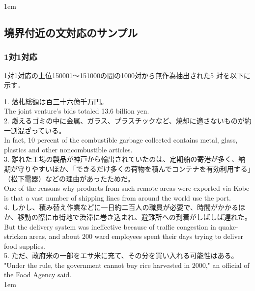 \normalsize
\parindent 1em

\subsection*{境界付近の文対応のサンプル}

\subsubsection*{1対1対応}

1対1対応の上位150001〜151000の間の1000対から無作為抽出された5
対を以下に示す．


\vspace{1em}
\parindent 0cm
\footnotesize

1. 落札総額は百三十六億千万円。\\
The joint venture's bids totaled 13.6 billion yen. \\

2. 燃えるゴミの中に金属、ガラス、プラスチックなど、焼却に適さないものが約一割混ざっている。\\
In fact, 10 percent of the combustible garbage collected contains metal, glass, plastics and other noncombustible articles. \\

3. 離れた工場の製品が神戸から輸出されていたのは、定期船の寄港が多く、納期が守りやすいほか、「できるだけ多くの荷物を積んでコンテナを有効利用する」（松下電器）などの理由があったためだ。\\
One of the reasons why products from such remote areas were exported via Kobe is that a vast number of shipping lines from around the world use the port. \\

4. しかし、積み替え作業などに一日約二百人の職員が必要で、時間がかかるほか、移動の際に市街地で渋滞に巻き込まれ、避難所への到着がしばしば遅れた。\\
But the delivery system was ineffective because of traffic congestion in quake-stricken areas, and about 200 ward employees spent their days trying to deliver food supplies. \\

5. ただ、政府米の一部をエサ米に充て、その分を買い入れる可能性はある。\\
"Under the rule, the government cannot buy rice harvested in 2000," an official of the Food Agency said. \\

\normalsize
\parindent 1em


